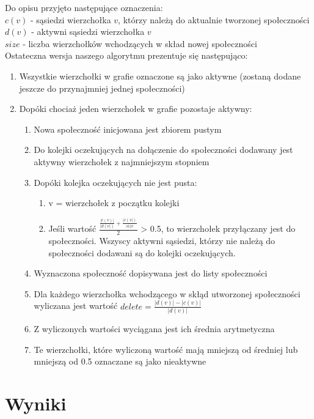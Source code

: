 \documentclass{article}
\begin{document}
Do opisu przyjęto następujące oznaczenia: \\
$c(v)$ - sąsiedzi wierzchołka $v$, którzy należą do aktualnie tworzonej społeczności \\
$d(v)$ - aktywni sąsiedzi wierzchołka $v$ \\
$size$ - liczba wierzchołków wchodzących w skład nowej społeczności \\

Ostateczna wersja naszego algorytmu prezentuje się następująco:

\begin{enumerate}
    \item Wszystkie wierzchołki w grafie oznaczone są jako aktywne (zostaną dodane jeszcze do przynajmniej jednej społeczności)
    \item Dopóki chociaż jeden wierzchołek w grafie pozostaje aktywny:
    \begin{enumerate}
        \item Nowa społeczność inicjowana jest zbiorem pustym
        \item Do kolejki oczekujących na dołączenie do społeczności dodawany jest aktywny wierzchołek z najmniejszym stopniem 
        \item Dopóki kolejka oczekujących nie jest pusta:
        \begin{enumerate}
            \item v = wierzchołek z początku kolejki
            \item Jeśli wartość $\frac{\frac{|c(v)|}{|d(v|)} + \frac{|c(v|)}{size}}{2}$ > 0.5, to wierzchołek przyłączany jest do społeczności. Wszyscy aktywni sąsiedzi, którzy nie należą do społeczności dodawani są do kolejki oczekujących.
        \end{enumerate}
        \item Wyznaczona społeczność dopisywana jest do listy społeczności
        \item Dla każdego wierzchołka wchodzącego w skłąd utworzonej społeczności wyliczana jest wartość $delete = \frac{|d(v)| - |c(v)|}{|d(v)|}$
        \item Z wyliczonych wartości wyciągana jest ich średnia arytmetyczna
        \item Te wierzchołki, które wyliczoną wartość mają mniejszą od średniej lub mniejszą od 0.5 oznaczane są jako nieaktywne
    \end{enumerate}
\end{enumerate}
\section{Wyniki}
\end{document}
